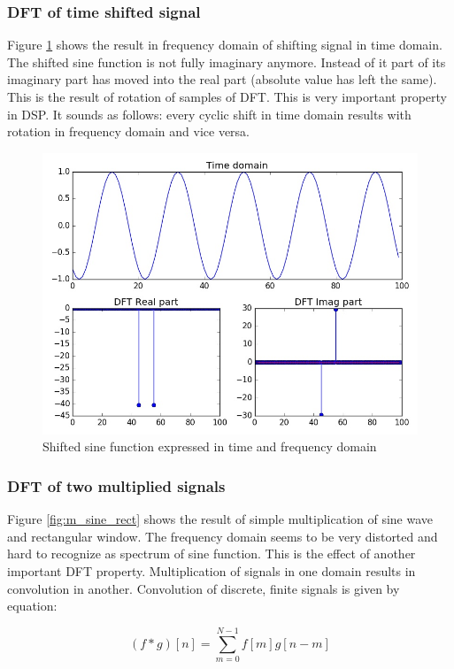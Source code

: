 \documentclass[magister]{dyplom}
\begin{document}
	
	\subsubsection{DFT of time shifted signal}
	
	Figure \ref{fig:sine_shifted} shows the result in frequency domain of shifting signal in time domain. The shifted sine function is not fully imaginary anymore. Instead of it part of its imaginary part has moved into the real part (absolute value has left the same). This is the result of rotation of samples of \gls{DFT}. This is very important property in \gls{DSP}. It sounds as follows: every cyclic shift in time domain results with rotation in frequency domain and vice versa.
	
	\begin{figure} [!th]
		\centering
		\includegraphics[width=0.7\linewidth]{images/sine_shifted}
		\caption{Shifted sine function expressed in time and frequency domain}
		\label{fig:sine_shifted}
	\end{figure}

	
	\subsubsection{DFT of two multiplied signals}

	Figure \ref{fig:m_sine_rect} shows the result of simple multiplication of sine wave and rectangular window. The frequency domain seems to be very distorted and hard to recognize as spectrum of sine function. This is the effect of another important \gls{DFT} property. Multiplication of signals in one domain results in convolution in another. Convolution of discrete, finite signals is given by equation:
	
	\begin{equation}
		(f * g)[n] = \sum_{m=0}^{N-1} f[m] g[n-m]
	\end{equation}
\end{document}
